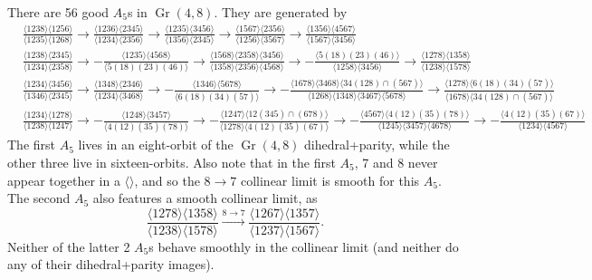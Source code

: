 \documentclass[11pt]{article}
\DeclareMathOperator{\Gr}{Gr}
\begin{document}
There are 56 good $A_5$s in $\Gr(4,8)$. They are generated by
\begin{align}
	&\frac{\langle 1238\rangle  \langle 1256\rangle }{\langle
   1235\rangle  \langle 1268\rangle }\to \frac{\langle
   1236\rangle  \langle 2345\rangle }{\langle 1234\rangle
    \langle 2356\rangle }\to \frac{\langle 1235\rangle 
   \langle 3456\rangle }{\langle 1356\rangle  \langle
   2345\rangle }\to \frac{\langle 1567\rangle  \langle
   2356\rangle }{\langle 1256\rangle  \langle 3567\rangle
   }\to \frac{\langle 1356\rangle  \langle 4567\rangle
   }{\langle 1567\rangle  \langle 3456\rangle }\\
   &\frac{\langle 1238\rangle  \langle 2345\rangle
   }{\langle 1234\rangle  \langle 2358\rangle
   }\to-\frac{\langle 1235\rangle  \langle 4568\rangle
   }{\langle 5(18)(23)(46)\rangle }\to\frac{\langle
   1568\rangle  \langle 2358\rangle  \langle 3456\rangle
   }{\langle 1358\rangle  \langle 2356\rangle  \langle
   4568\rangle }\to-\frac{\langle 5(18)(23)(46)\rangle
   }{\langle 1258\rangle  \langle 3456\rangle
   }\to\frac{\langle 1278\rangle  \langle 1358\rangle
   }{\langle 1238\rangle  \langle 1578\rangle }\\
   &\frac{\langle 1234\rangle  \langle 3456\rangle
   }{\langle 1346\rangle  \langle 2345\rangle
   }\to\frac{\langle 1348\rangle  \langle 2346\rangle
   }{\langle 1234\rangle  \langle 3468\rangle
   }\to-\frac{\langle 1346\rangle  \langle 5678\rangle
   }{\langle 6(18)(34)(57)\rangle }\to-\frac{\langle
   1678\rangle  \langle 3468\rangle  \langle 34(128)\cap
   (567)\rangle }{\langle 1268\rangle  \langle
   1348\rangle  \langle 3467\rangle  \langle 5678\rangle
   }\to\frac{\langle 1278\rangle  \langle
   6(18)(34)(57)\rangle }{\langle 1678\rangle  \langle
   34(128)\cap (567)\rangle }\\
   &\frac{\langle 1234\rangle  \langle 1278\rangle
   }{\langle 1238\rangle  \langle 1247\rangle
   }\to-\frac{\langle 1248\rangle  \langle 3457\rangle
   }{\langle 4(12)(35)(78)\rangle }\to-\frac{\langle
   1247\rangle  \langle 12(345)\cap (678)\rangle
   }{\langle 1278\rangle  \langle 4(12)(35)(67)\rangle
   }\to-\frac{\langle 4567\rangle  \langle
   4(12)(35)(78)\rangle }{\langle 1245\rangle  \langle
   3457\rangle  \langle 4678\rangle }\to-\frac{\langle
   4(12)(35)(67)\rangle }{\langle 1234\rangle  \langle
   4567\rangle }
\end{align}
The first $A_5$ lives in an eight-orbit of the $\Gr(4,8)$ dihedral+parity, while the other three live in sixteen-orbits. Also note that in the first $A_5$, 7 and 8 never appear together in a $\langle\rangle$, and so the $8\to7$ collinear limit is smooth for this $A_5$. The second $A_5$ also features a smooth collinear limit, as 
\begin{equation}
	\frac{\langle 1278\rangle  \langle 1358\rangle
   }{\langle 1238\rangle  \langle 1578\rangle } \xrightarrow{8\to7} \frac{\langle 1267\rangle  \langle 1357\rangle
   }{\langle 1237\rangle  \langle 1567\rangle }.
\end{equation}
Neither of the latter 2 $A_5$s behave smoothly in the collinear limit (and neither do any of their dihedral+parity images).
\end{document}
